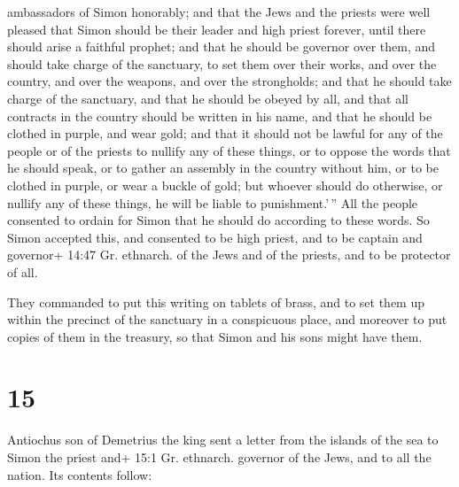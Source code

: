 ambassadors of Simon honorably;  and that the Jews and the
priests were well pleased that Simon should be their leader and high
priest forever, until there should arise a faithful prophet;
 and that he should be governor over them, and should take
charge of the sanctuary, to set them over their works, and over the
country, and over the weapons, and over the strongholds; and that he
should take charge of the sanctuary,  and that he should be
obeyed by all, and that all contracts in the country should be written
in his name, and that he should be clothed in purple, and wear gold;
 and that it should not be lawful for any of the people or
of the priests to nullify any of these things, or to oppose the words
that he should speak, or to gather an assembly in the country without
him, or to be clothed in purple, or wear a buckle of gold; 
but whoever should do otherwise, or nullify any of these things, he will
be liable to punishment.'\,''  All the people consented to
ordain for Simon that he should do according to these words.
 So Simon accepted this, and consented to be high priest,
and to be captain and governor+ 14:47 Gr. ethnarch. of the Jews and of
the priests, and to be protector of all.

 They commanded to put this writing on tablets of brass,
and to set them up within the precinct of the sanctuary in a conspicuous
place,  and moreover to put copies of them in the treasury,
so that Simon and his sons might have them.

\hypertarget{section-14}{%
\section{15}\label{section-14}}

 Antiochus son of Demetrius the king sent a letter from the
islands of the sea to Simon the priest and+ 15:1 Gr. ethnarch. governor
of the Jews, and to all the nation.  Its contents follow:

